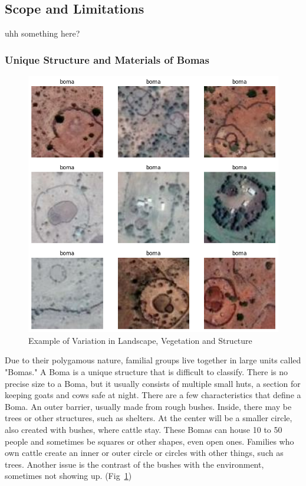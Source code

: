 \documentclass[10pt]{article}
\begin{document}








\subsection{Scope and Limitations}



uhh something here?





\subsubsection{Unique Structure and Materials of Bomas}

\begin{figure} [H]
    \centering
    \includegraphics[width=0.8\linewidth]{images/types of bomas.png}
    \caption{Example of Variation in Landscape, Vegetation and Structure}
    \label{fig:types_of_bomas}
\end{figure}

Due to their polygamous nature, familial groups live together in large units called "Bomas." A Boma is a unique structure that is difficult to classify. There is no precise size to a Boma, but it usually consists of multiple small huts, a section for keeping goats and cows safe at night. There are a few characteristics that define a Boma. An outer barrier, usually made from rough bushes. Inside, there may be trees or other structures, such as shelters. At the center will be a smaller circle, also created with bushes, where cattle stay. These Bomas can house 10 to 50 people and sometimes be squares or other shapes, even open ones. Families who own cattle create an inner or outer circle or circles with other things, such as trees. Another issue is the contrast of the bushes with the environment, sometimes not showing up. (Fig~\ref{fig:types_of_bomas})
\end{document}
